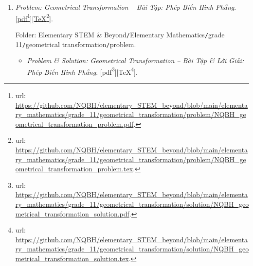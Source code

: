 \documentclass[12pt,oneside]{book}
\begin{document}
\begin{enumerate}
	Folder: {\sf Elementary STEM \& Beyond{\tt/}Elementary Mathematics{\tt/}grade 11{\tt/}orthogonality{\tt/}problem}.
	\begin{itemize}
		\item {\it Problem \& Solution: Perpendicular Relation in 3D Space. Orthographic Projection -- Bài Tập \& Lời Giải: Quan Hệ Vuông Góc Trong Không Gian 3D. Phép Chiếu Vuông Góc}. [\href{https://github.com/NQBH/elementary_STEM_beyond/blob/main/elementary_mathematics/grade_11/orthogonality/solution/NQBH_orthogonality_solution.pdf}{pdf}\footnote{{\sc url}: \url{https://github.com/NQBH/elementary_STEM_beyond/blob/main/elementary_mathematics/grade_11/orthogonality/solution/NQBH_orthogonality_solution.pdf}.}][\href{https://github.com/NQBH/elementary_STEM_beyond/blob/main/elementary_mathematics/grade_11/orthogonality/solution/NQBH_orthogonality_solution.tex}{\TeX}\footnote{{\sc url}: \url{https://github.com/NQBH/elementary_STEM_beyond/blob/main/elementary_mathematics/grade_11/orthogonality/solution/NQBH_orthogonality_solution.tex}.}].
		
		Folder: {\sf Elementary STEM \& Beyond{\tt/}Elementary Mathematics{\tt/}grade 11{\tt/}orthogonality{\tt/}solution}.
	\end{itemize}
	\item {\it Problem: Geometrical Transformation -- Bài Tập: Phép Biến Hình Phẳng}. [\href{https://github.com/NQBH/elementary_STEM_beyond/blob/main/elementary_mathematics/grade_11/geometrical_transformation/problem/NQBH_geometrical_transformation_problem.pdf}{pdf}\footnote{{\sc url}: \url{https://github.com/NQBH/elementary_STEM_beyond/blob/main/elementary_mathematics/grade_11/geometrical_transformation/problem/NQBH_geometrical_transformation_problem.pdf}.}][\href{https://github.com/NQBH/elementary_STEM_beyond/blob/main/elementary_mathematics/grade_11/geometrical_transformation/problem/NQBH_geometrical_transformation_problem.tex}{\TeX}\footnote{{\sc url}: \url{https://github.com/NQBH/elementary_STEM_beyond/blob/main/elementary_mathematics/grade_11/geometrical_transformation/problem/NQBH_geometrical_transformation_problem.tex}.}].
	
	Folder: {\sf Elementary STEM \& Beyond{\tt/}Elementary Mathematics{\tt/}grade 11{\tt/}geometrical transformation{\tt/}problem}.
	\begin{itemize}
		\item {\it Problem \& Solution: Geometrical Transformation -- Bài Tập \& Lời Giải: Phép Biến Hình Phẳng}. [\href{https://github.com/NQBH/elementary_STEM_beyond/blob/main/elementary_mathematics/grade_11/geometrical_transformation/solution/NQBH_geometrical_transformation_solution.pdf}{pdf}\footnote{{\sc url}: \url{https://github.com/NQBH/elementary_STEM_beyond/blob/main/elementary_mathematics/grade_11/geometrical_transformation/solution/NQBH_geometrical_transformation_solution.pdf}.}][\href{https://github.com/NQBH/elementary_STEM_beyond/blob/main/elementary_mathematics/grade_11/geometrical_transformation/solution/NQBH_geometrical_transformation_solution.tex}{\TeX}\footnote{{\sc url}: \url{https://github.com/NQBH/elementary_STEM_beyond/blob/main/elementary_mathematics/grade_11/geometrical_transformation/solution/NQBH_geometrical_transformation_solution.tex}.}].
		

\end{itemize}
\end{enumerate}
\end{document}

